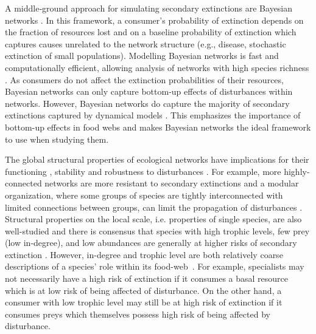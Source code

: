 \documentclass[12pt]{article}
\begin{document}
\begin{spacing}{2.0}
    
    A middle‐ground approach for simulating secondary extinctions are Bayesian networks \citep{Eklof2013}. In this framework, a consumer's probability of extinction depends on the fraction of resources lost and on a baseline probability of extinction which captures causes unrelated to the network structure (e.g., disease, stochastic extinction of small populations). Modelling Bayesian networks is fast and computationally efficient, allowing analysis of networks with high species richness \citep{Haussler2020}. 
    As consumers do not affect the extinction probabilities of their resources, Bayesian networks can only capture bottom-up effects of disturbances within networks. However, Bayesian networks do capture the majority of secondary extinctions captured by dynamical models \citep{Eklof2013}.
    This emphasizes the importance of bottom-up effects in food webs and makes Bayesian networks the ideal framework to use when studying them.  

    The global structural properties of ecological networks have implications for their functioning \citep{Petchey2002}, stability \citep{Allesina2012} and robustness to disturbances \citep{Dunne2002d, Eklof2006}. For example, more highly-connected networks are more resistant to secondary extinctions \citep{Dunne2002d, Eklof2006} and a modular organization, where some groups of species are tightly interconnected with limited connections between groups, can limit the propagation of disturbances \citep{}.
    Structural properties on the local scale, i.e. properties of single species, are also well-studied and there is consensus that species with high trophic levels, few prey (low in-degree), and low abundances are generally at higher risks of secondary extinction \citep{binzer2011susceptibility}. However, in-degree and trophic level are both relatively coarse descriptions of a species' role within its food-web~\citep{Cirtwill2018FoodWebs}. 
    For example, specialists may not necessarily have a high risk of extinction if it consumes a basal resource which is at low risk of being affected of disturbance. On the other hand, a consumer with low trophic level may still be at high risk of extinction if it consumes preys which themselves possess high risk of being affected by disturbance. 
    

\end{spacing}
\end{document}
